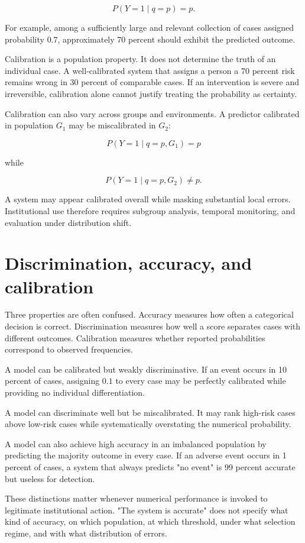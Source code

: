 \[
P(Y=1\mid q=p)=p.
\]

For example, among a sufficiently large and relevant collection of cases assigned probability \(0.7\), approximately 70 percent should exhibit the predicted outcome.

Calibration is a population property. It does not determine the truth of an individual case. A well-calibrated system that assigns a person a 70 percent risk remains wrong in 30 percent of comparable cases. If an intervention is severe and irreversible, calibration alone cannot justify treating the probability as certainty.

Calibration can also vary across groups and environments. A predictor calibrated in population \(G_1\) may be miscalibrated in \(G_2\):

\[
P(Y=1\mid q=p,G_1)=p
\]

while

\[
P(Y=1\mid q=p,G_2)\neq p.
\]

A system may appear calibrated overall while masking substantial local errors. Institutional use therefore requires subgroup analysis, temporal monitoring, and evaluation under distribution shift.

\section{Discrimination, accuracy, and calibration}
\label{sec:a19}

Three properties are often confused. Accuracy measures how often a categorical decision is correct. Discrimination measures how well a score separates cases with different outcomes. Calibration measures whether reported probabilities correspond to observed frequencies.

A model can be calibrated but weakly discriminative. If an event occurs in 10 percent of cases, assigning \(0.1\) to every case may be perfectly calibrated while providing no individual differentiation.

A model can discriminate well but be miscalibrated. It may rank high-risk cases above low-risk cases while systematically overstating the numerical probability.

A model can also achieve high accuracy in an imbalanced population by predicting the majority outcome in every case. If an adverse event occurs in 1 percent of cases, a system that always predicts "no event" is 99 percent accurate but useless for detection.

These distinctions matter whenever numerical performance is invoked to legitimate institutional action. "The system is accurate" does not specify what kind of accuracy, on which population, at which threshold, under what selection regime, and with what distribution of errors.


